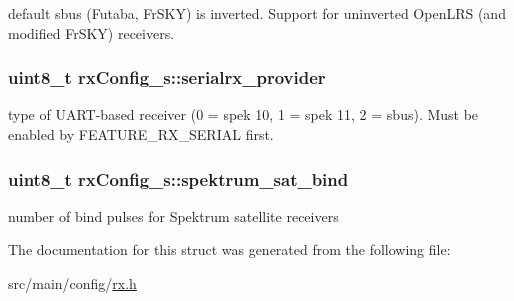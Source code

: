 default sbus (Futaba, Fr\+S\+K\+Y) is inverted. Support for uninverted Open\+L\+R\+S (and modified Fr\+S\+K\+Y) receivers. 

\hypertarget{structrxConfig__s_a07206bf99d4d97e08c39f911c5a5c3d1}{
\subsubsection[{serialrx\+\_\+provider}]{\setlength{\rightskip}{0pt plus 5cm}uint8\+\_\+t rx\+Config\+\_\+s\+::serialrx\+\_\+provider}}\label{structrxConfig__s_a07206bf99d4d97e08c39f911c5a5c3d1}


type of U\+A\+R\+T-\/based receiver (0 = spek 10, 1 = spek 11, 2 = sbus). Must be enabled by F\+E\+A\+T\+U\+R\+E\+\_\+\+R\+X\+\_\+\+S\+E\+R\+I\+A\+L first. 

\hypertarget{structrxConfig__s_ae7f99ea1200fd047ae4e510f46ecbcba}{
\subsubsection[{spektrum\+\_\+sat\+\_\+bind}]{\setlength{\rightskip}{0pt plus 5cm}uint8\+\_\+t rx\+Config\+\_\+s\+::spektrum\+\_\+sat\+\_\+bind}}\label{structrxConfig__s_ae7f99ea1200fd047ae4e510f46ecbcba}


number of bind pulses for Spektrum satellite receivers 



The documentation for this struct was generated from the following file\+:\begin{DoxyCompactItemize}
\item 
src/main/config/\hyperlink{config_2rx_8h}{rx.\+h}\end{DoxyCompactItemize}
